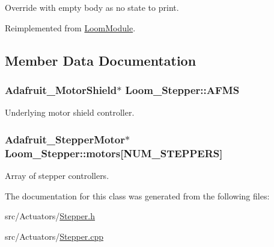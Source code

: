 Override with empty body as no state to print. 



Reimplemented from \hyperlink{class_loom_module_a96505b45f2e712eab5de873b4d49dfc7}{Loom\+Module}.



\subsection{Member Data Documentation}
\subsubsection[{\texorpdfstring{A\+F\+MS}{AFMS}}]{\setlength{\rightskip}{0pt plus 5cm}Adafruit\+\_\+\+Motor\+Shield$\ast$ Loom\+\_\+\+Stepper\+::\+A\+F\+MS\hspace{0.3cm}{\ttfamily [protected]}}\hypertarget{class_loom___stepper_a6e1cef0a5db1d2d69c1fb09f1046770a}{}\label{class_loom___stepper_a6e1cef0a5db1d2d69c1fb09f1046770a}


Underlying motor shield controller. 

\subsubsection[{\texorpdfstring{motors}{motors}}]{\setlength{\rightskip}{0pt plus 5cm}Adafruit\+\_\+\+Stepper\+Motor$\ast$ Loom\+\_\+\+Stepper\+::motors\mbox{[}{\bf N\+U\+M\+\_\+\+S\+T\+E\+P\+P\+E\+RS}\mbox{]}\hspace{0.3cm}{\ttfamily [protected]}}\hypertarget{class_loom___stepper_a208acec02d1249fb449a17ca5e334cee}{}\label{class_loom___stepper_a208acec02d1249fb449a17ca5e334cee}


Array of stepper controllers. 



The documentation for this class was generated from the following files\+:\begin{DoxyCompactItemize}
\item 
src/\+Actuators/\hyperlink{_stepper_8h}{Stepper.\+h}\item 
src/\+Actuators/\hyperlink{_stepper_8cpp}{Stepper.\+cpp}\end{DoxyCompactItemize}
